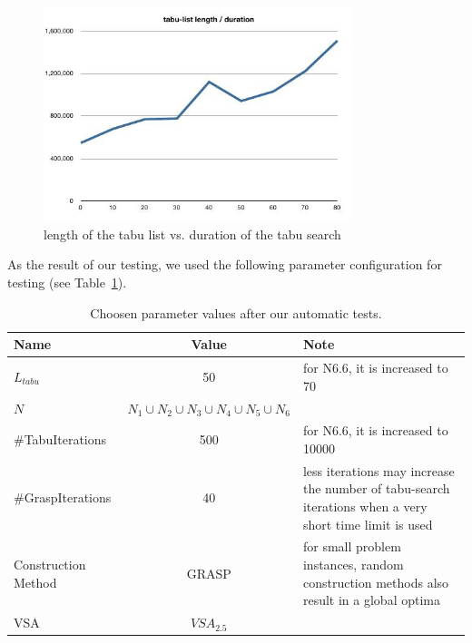\documentclass[a4paper,11pt]{article}
\begin{document}
\begin{figure}[htb]
  \begin{center}
    \includegraphics[width=0.8\textwidth]{images/tabulist-len-duration}
  \end{center}
  \caption{length of the tabu list vs. duration of the tabu search}
  \label{fig:tabu_len_dur}
\end{figure}

As the result of our testing, we used the following parameter configuration for testing (see Table~\ref{tab:param-1}).

\begin{center}
  \begin{table}[htb]
    \begin{tabularx}{\linewidth}{| l | c | X | }
      \hline
      Name & Value & Note \\   \hline     \hline
      $L_{tabu}$ & 50 & for N6.6, it is increased to 70 \\ \hline
      $N$ &  $N_1 \cup N_2 \cup N_3 \cup N_4 \cup N_5 \cup N_6$ &  \\ \hline
      \#TabuIterations & 500  &for N6.6, it is increased to 10000 \\ \hline
      \#GraspIterations &  40 & less iterations may increase the number of tabu-search iterations when a very short time limit is used \\ \hline
      Construction Method & GRASP  & for small problem instances, random construction methods also result in a global optima \\ \hline
      VSA & $VSA_{2.5}$  & \\ \hline
    \end{tabularx}
    \caption{Choosen parameter values after our automatic tests.}
  \label{tab:param-1}
  \end{table}
\end{center}
\end{document}
